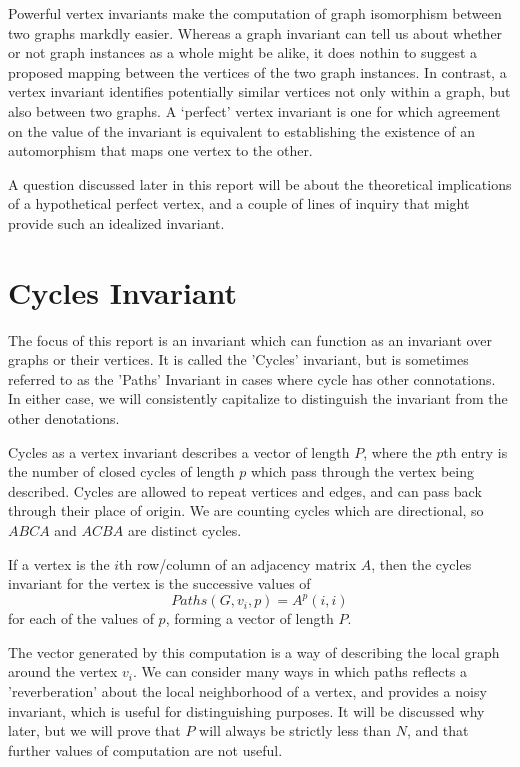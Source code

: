\documentclass[11pt,a4paper]{report}
\begin{document}
Powerful vertex invariants make the computation of graph isomorphism between two graphs markdly easier. 
Whereas a graph invariant can tell us about whether or not graph instances as a whole might be alike, it does nothin to suggest a proposed mapping between the vertices of the two graph instances.
In contrast, a vertex invariant identifies potentially similar vertices not only within a graph, but also between two graphs.
A `perfect' vertex invariant is one for which agreement on the value of the invariant is equivalent to establishing the existence of an automorphism that maps one vertex to the other.

A question discussed later in this report will be about the theoretical implications of a hypothetical perfect vertex, and a couple of lines of inquiry that might provide such an idealized invariant.

\section{Cycles Invariant}
The focus of this report is an invariant which can function as an invariant over graphs or their vertices.
It is called the 'Cycles' invariant, but is sometimes referred to as the 'Paths' Invariant in cases where cycle has other connotations.
In either case, we will consistently capitalize to distinguish the invariant from the other denotations.

Cycles as a vertex invariant describes a vector of length $P$, where the $p$th entry is the number of closed cycles of length $p$ which pass through the vertex being described.
Cycles are allowed to repeat vertices and edges, and can pass back through their place of origin.
We are counting cycles which are directional, so $ABCA$ and $ACBA$ are distinct cycles. 

If a vertex is the $i$th row/column of an adjacency matrix $A$, then the cycles invariant for the vertex is the successive values of $$Paths(G, v_i, p) = A^p(i,i)$$
for each of the values of $p$, forming a vector of length $P$.

The vector generated by this computation is a way of describing the local graph around the vertex $v_i$.
We can consider many ways in which paths reflects a 'reverberation' about the local neighborhood of a vertex, and provides a noisy invariant, which is useful for distinguishing purposes. 
It will be discussed why later, but we will prove that $P$ will always be strictly less than $N$, and that further values of computation are not useful.
\end{document}
